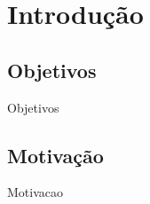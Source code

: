 	\chapter*[Introdução]{Introdução} %
	
	\section*{Objetivos}\label{sec-objetivos}
	
	Objetivos

	\section*{Motivação}\label{sec-motivacao}
		
	Motivacao